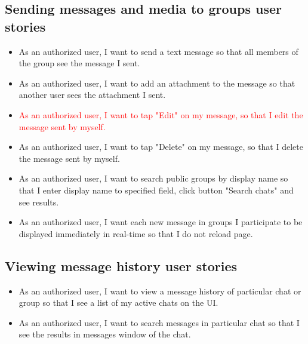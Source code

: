 \subsection{Sending messages and media to groups user stories}
\label{subsec:sending-messages-and-media-to-groups}
\begin{itemize}
    \item As an authorized user, I want to send a text message so that all members of the group see the message I sent.
    \item As an authorized user, I want to add an attachment to the message so that another user sees the attachment I sent.
    \item \textcolor{red}{As an authorized user, I want to tap "Edit" on my message, so that I edit the message sent by myself.}
    \item As an authorized user, I want to tap "Delete" on my message, so that I delete the message sent by myself.
    \item As an authorized user, I want to search public groups by display name so that I enter display name to specified field,
    click button "Search chats" and see results.
    \item As an authorized user, I want each new message in groups I participate to be displayed immediately in
    real-time so that I do not reload page.
\end{itemize}

\subsection{Viewing message history user stories}\label{subsec:viewing-message-history-feature-user-stories}
\begin{itemize}
    \item As an authorized user, I want to view a message history of particular chat or group so that I see a list of my active chats on the UI\@.
    \item As an authorized user, I want to search messages in particular chat so that I see the results in messages window of the chat.
\end{itemize}

